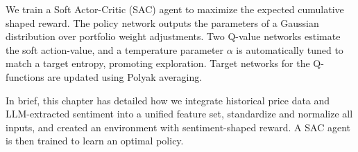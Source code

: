 We train a Soft Actor-Critic (SAC) agent to maximize the expected cumulative shaped reward.  The policy network outputs the parameters of a Gaussian distribution over portfolio weight adjustments.  Two Q-value networks estimate the soft action-value, and a temperature parameter $\alpha$ is automatically tuned to match a target entropy, promoting exploration.  Target networks for the Q-functions are updated using Polyak averaging.

In brief, this chapter has detailed how we integrate historical price data and \gls{LLM}-extracted sentiment into a unified feature set, standardize and normalize all inputs, and created an environment with sentiment-shaped reward. A \gls{SAC} agent is then trained to learn an optimal policy.
